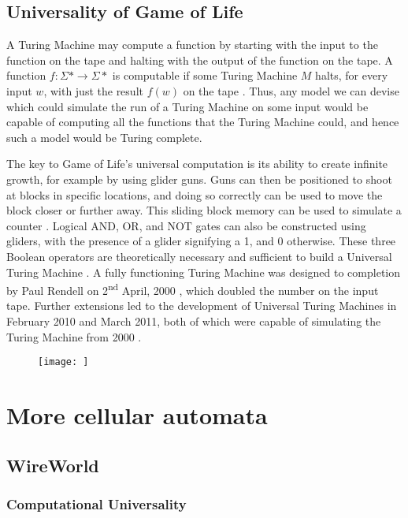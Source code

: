 \documentclass[11pt,a4paper]{article}
\begin{document}
    \subsection{Universality of Game of Life}
    A Turing Machine may compute a function by starting with the input to the
    function on the tape and halting with the output of the function on the
    tape. A function $f : \Sigma \ast \rightarrow \Sigma \ast$ is computable if
    some Turing Machine $M$ halts, for every input $w$, with just the result
    $f(w)$ on the tape \cite{Computable}. Thus, any model we can devise which
    could simulate the run of a Turing Machine on some input would be capable of
    computing all the functions that the Turing Machine could, and hence such a
    model would be Turing complete.

    The key to Game of Life's universal computation is its ability to create
    infinite growth, for example by using glider guns. Guns can then be
    positioned to shoot at blocks in specific locations, and doing so correctly
    can be used to move the block closer or further away. This sliding block
    memory can be used to simulate a counter \cite{Counter}. Logical AND, OR,
    and NOT gates can also be constructed using gliders, with the presence of a
    glider signifying a 1, and 0 otherwise. These three Boolean operators are
    theoretically necessary and sufficient to build a Universal Turing Machine
    \cite{BoolTM}. A fully functioning Turing Machine was designed to completion
    by Paul Rendell on 2\textsuperscript{nd} April, 2000 \cite{golTM}, which
    doubled the number on the input tape. Further extensions led to the
    development of Universal Turing Machines in February 2010 and March 2011,
    both of which were capable of simulating the Turing Machine from 2000
    \cite{golUTM1,golUTM2}.

    \begin{figure}[h]
        \texttt{[image: ]}
        \caption{}
        \label{}
    \end{figure}

\section{More cellular automata}
    \subsection{WireWorld}
    \subsubsection{Computational Universality}
\end{document}
